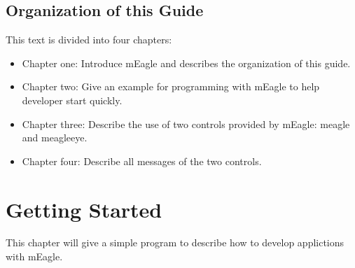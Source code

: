 \documentclass[a4paper]{article}
\begin{document}
\subsection{Organization of this Guide}
This text is divided into four chapters:
\begin{itemize}
\item Chapter one: Introduce mEagle and describes the organization of this guide.
\item Chapter two: Give an example for programming with mEagle to help developer start quickly.
\item Chapter three: Describe the use of two controls provided by mEagle: meagle and meagleeye.
\item Chapter four: Describe all messages of the two controls.
\end{itemize} 


\newpage


\section{Getting Started}
This chapter will give a simple program to describe how to develop applictions with mEagle.
\end{document}
